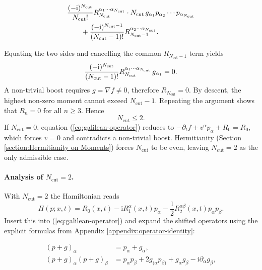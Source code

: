 \documentclass{book}
\newcommand{\mathi}{\mathrm{i}}
\newcommand{\tmop}[1]{\ensuremath{\operatorname{#1}}}
\begin{document}
\begin{align*}
  & \frac{(- \mathi)^{N_{\tmop{cut}}}}{N_{\tmop{cut}} !}
  R_{N_{\tmop{cut}}}^{\alpha_1 \cdots \alpha_{N_{\tmop{cut}}}} \cdot
  N_{\tmop{cut}}  \hspace{0.17em} g_{\alpha_1} p_{\alpha_2} \cdots
  p_{\alpha_{N_{\tmop{cut}}}}\\
  & \qquad + \frac{(- \mathi)^{N_{\tmop{cut}} - 1}}{(N_{\tmop{cut}} - 1) !}
  R_{N_{\tmop{cut}} - 1}^{\alpha_2 \cdots \alpha_{N_{\tmop{cut}}}} .
\end{align*}

Equating the two sides and cancelling the common $R_{N_{\tmop{cut}} - 1}$ term
yields
\begin{equation}
  \frac{(- \mathi)^{N_{\tmop{cut}}}}{(N_{\tmop{cut}} - 1) !}
  R_{N_{\tmop{cut}}}^{\alpha_1 \cdots \alpha_{N_{\tmop{cut}}}} 
  \hspace{0.17em} g_{\alpha_1} = 0. \label{eq:constraint-N}
\end{equation}
A non-trivial boost requires $g = \nabla f \neq 0$, therefore
$R_{N_{\tmop{cut}}} = 0$. By descent, the highest non-zero moment cannot
exceed $N_{\tmop{cut}} - 1$. Repeating the argument shows that $R_n = 0$ for
all $n \ge 3$. Hence
\[ \boxed{N_{\tmop{cut}} \le 2} . \]
If $N_{\tmop{cut}} = 0$, equation (\ref{eq:galilean-operator}) reduces to $-
\partial_t f + v^{\alpha} p_{\alpha} + R_0 = R_0$, which forces $v = 0$ and
contradicts a non-trivial boost. Hermitianity (Section
\ref{section:Hermitianity on Moments}) forces $N_{\tmop{cut}}$ to be even,
leaving $\boxed{N_{\tmop{cut}} = 2}$ as the only admissible case.

\paragraph{Analysis of $N_{\tmop{cut}} = 2$.} With $N_{\tmop{cut}} = 2$ the
Hamiltonian reads
\[ H (p ; x, t) = R_0  (x, t) - \mathi R_1^{\alpha}  (x, t) p_{\alpha} -
   \frac{1}{2} R_2^{\alpha \beta}  (x, t) p_{\alpha} p_{\beta} . \]
Insert this into (\ref{eq:galilean-operator}) and expand the shifted operators
using the explicit formulas from Appendix \ref{appendix:operator-identity}:

\begin{align*}
  (p + g)_{\alpha} & = p_{\alpha} + g_{\alpha},\\
  (p + g)_{\alpha}  (p + g)_{\beta} & = p_{\alpha} p_{\beta} + 2 g_{(\alpha}
  p_{\beta)} + g_{\alpha} g_{\beta} - \mathi \partial_{\alpha} g_{\beta},
\end{align*}
\end{document}
